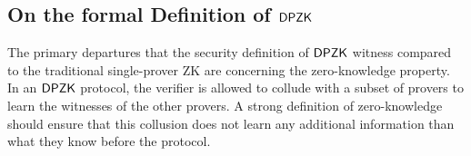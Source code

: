 \subsection{On the formal Definition of $\mathsf{DPZK}$}
The primary departures that the security definition of $\mathsf{DPZK}$ witness compared to the  traditional single-prover ZK are concerning the zero-knowledge property.     
In an $\mathsf{DPZK}$ protocol, the verifier is allowed to collude with a subset of provers to learn the witnesses of the other provers. A strong definition of zero-knowledge should ensure that this collusion does not learn any additional information than what they know before the protocol. %


